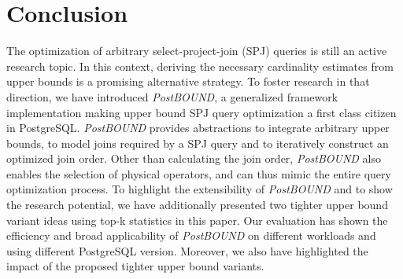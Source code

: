 \section{Conclusion}
\label{sec:Conclusion}
The optimization of arbitrary select-project-join (SPJ) queries is still an active research topic.
In this context, deriving the necessary cardinality estimates from upper bounds is a promising alternative strategy.
To foster research in that direction, we have introduced \emph{PostBOUND}, a generalized framework implementation making upper bound SPJ query optimization a first class citizen in PostgreSQL. 
\emph{PostBOUND} provides abstractions to integrate arbitrary upper bounds, to model joins required by a SPJ query and to iteratively construct an optimized join order. Other than calculating the join order, \emph{PostBOUND} also enables the selection of physical operators, and can thus mimic the entire query optimization process.
To highlight the extensibility of \emph{PostBOUND} and to show the research potential, we have additionally presented two tighter upper bound variant ideas using top-k statistics in this paper.
Our evaluation has shown the efficiency and broad applicability of \emph{PostBOUND} on different workloads and using different PostgreSQL version. 
Moreover, we also have highlighted the impact of the proposed tighter upper bound variants. 